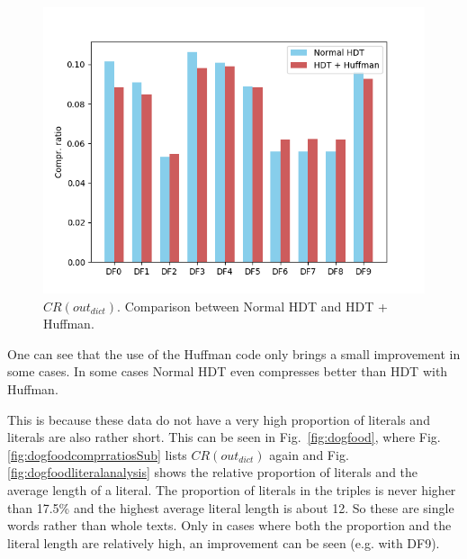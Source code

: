 \begin{figure}
	\centering
	\includegraphics[width=0.7\linewidth]{figures/4_evaluation/dogFoodComprRatios}
	\caption{$CR(out_{dict})$. Comparison between Normal HDT and HDT + Huffman.}
	\label{fig:dogfoodcomprratios}
\end{figure}

One can see that the use of the Huffman code only brings a small improvement in some cases. In some cases Normal HDT even compresses better than HDT with Huffman.

This is because these data do not have a very high proportion of literals and literals are also rather short. This can be seen in Fig.~\ref{fig:dogfood}, where Fig.\ref{fig:dogfoodcomprratiosSub} lists $CR(out_{dict})$ again and Fig.\ref{fig:dogfoodliteralanalysis} shows the relative proportion of literals and the average length of a literal. The proportion of literals in the triples is never higher than 17.5\% and the highest average literal length is about 12. So these are single words rather than whole texts. Only in cases where both the proportion and the literal length are relatively high, an improvement can be seen (e.g. with DF9).


